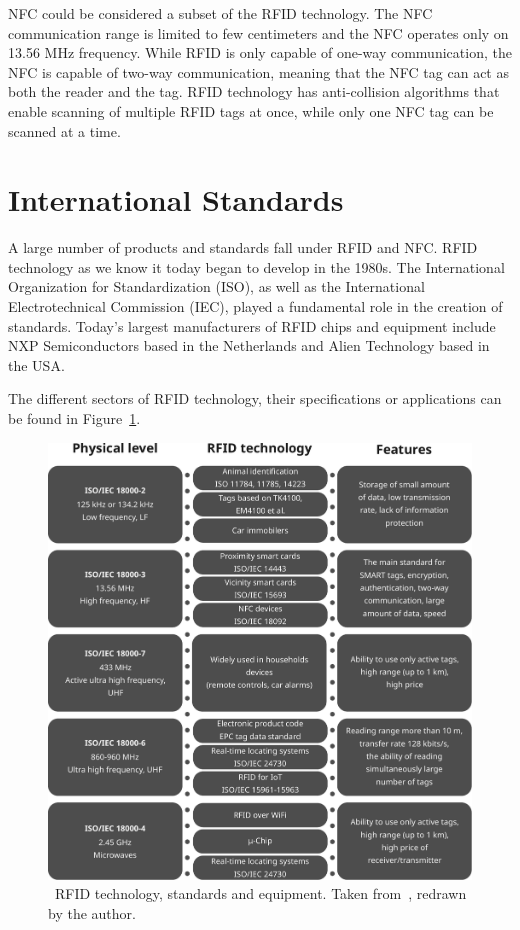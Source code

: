 NFC could be considered a subset of the RFID technology. The NFC communication range is limited to few centimeters and the NFC operates only on 13.56 MHz frequency. While RFID is only capable of one-way communication, the NFC is capable of two-way communication, meaning that the NFC tag can act as both the reader and the tag. RFID technology has anti-collision algorithms that enable scanning of multiple RFID tags at once, while only one NFC tag  can be scanned at a time.~\cite{rfidnfcdifference}


\section{International Standards}

A large number of products and standards fall under RFID and NFC. RFID technology as we know it today began to develop in the 1980s. The International Organization for Standardization (ISO), as well as the International Electrotechnical Commission (IEC), played a fundamental role in the creation of standards. Today's largest manufacturers of RFID chips and equipment include NXP Semiconductors based in the Netherlands and Alien Technology based in the USA.~\cite{masyuk2019information}

The different sectors of RFID technology, their specifications or applications can be found in Figure~\ref{fig:rfid-graph}.


\begin{figure}[ht]
  \centering
  \includegraphics[width=14cm]{text/theoretical_background/rfid_graph.pdf} %
  \caption[RFID technology, standards and equipment.]{~RFID technology, standards and equipment. Taken from~\cite{masyuk2019information}, redrawn by the author.}
  \label{fig:rfid-graph}
\end{figure}


